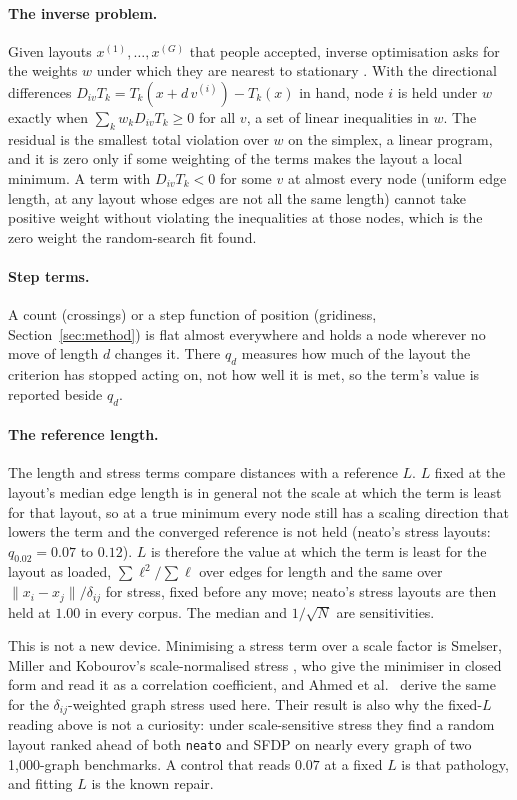 \documentclass[11pt]{article}
\begin{document}
\paragraph{The inverse problem.} Given layouts $x^{(1)}, \dots, x^{(G)}$ that people
accepted, inverse optimisation asks for the weights $w$ under which they are nearest to stationary \cite{keshavarz11, chan19}. With the directional differences
$D_{iv} T_k = T_k(x + d\,v^{(i)}) - T_k(x)$ in hand, node $i$ is held under $w$ exactly when $\sum_k w_k D_{iv} T_k \ge 0$ for all $v$, a set of linear inequalities in $w$. The residual is the smallest total violation over $w$ on the simplex, a linear program, and it is zero only if some weighting of the terms makes the layout a local minimum. A term with $D_{iv} T_k < 0$ for some $v$ at almost every node (uniform edge length, at any layout whose edges are not all the same length) cannot take positive weight without violating the inequalities at those nodes, which is the zero weight the random-search fit found.

\paragraph{Step terms.} A count (crossings) or a step function of position (gridiness,
Section~\ref{sec:method}) is flat almost everywhere and holds a node wherever no move of
length $d$ changes it. There $q_d$ measures how much of the layout the criterion has stopped
acting on, not how well it is met, so the term's value is reported beside $q_d$.

\paragraph{The reference length.} The length and stress terms compare distances with a
reference $L$. $L$ fixed at the layout's median edge length is in general not the scale at
which the term is least for that layout, so at a true minimum every node still has a
scaling direction that lowers the term and the converged reference is not held (neato's
stress layouts: $q_{0.02} = 0.07$ to $0.12$). $L$ is therefore the value at which the term is
least for the layout as loaded, $\sum \ell^2 / \sum \ell$ over edges for length and the same
over $\|x_i - x_j\| / \delta_{ij}$ for stress, fixed before any move; neato's stress
layouts are then held at $1.00$ in every corpus. The median and $1/\sqrt{N}$ are
sensitivities.

This is not a new device. Minimising a stress term
over a scale factor is Smelser, Miller and Kobourov's scale-normalised stress
\cite{smelser24}, who give the minimiser in closed form and read it as a correlation
coefficient, and Ahmed et al.\ \cite{ahmed24} derive the same for the $\delta_{ij}$-weighted
graph stress used here. Their result is also why the fixed-$L$ reading above is not a
curiosity: under scale-sensitive stress they find a random layout ranked ahead of both
\texttt{neato} and SFDP on nearly every graph of two 1{,}000-graph benchmarks. A
control that reads $0.07$ at a fixed $L$ is that pathology, and fitting $L$ is the known
repair.
\end{document}
